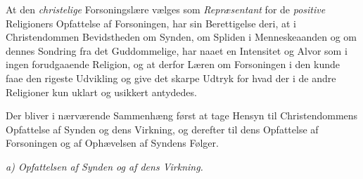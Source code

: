 At den \emph{christelige} Forsoningslære vælges som \emph{Repræsentant} for de
\emph{positive} Religioners Opfattelse af Forsoningen, har sin Berettigelse
deri, at i Christendommen Bevidstheden om Synden, om Spliden i Menneskeaanden og
om dennes Sondring fra det Guddommelige, har naaet en Intensitet og Alvor som i
ingen forudgaaende Religion, og at derfor Læren om Forsoningen i den kunde faae
den rigeste Udvikling og give det skarpe Udtryk for hvad der i de andre
Religioner kun uklart og usikkert antydedes.

 Der bliver i nærværende Sammenhæng først at tage Hensyn til Christendommens
Opfattelse af Synden og dens Virkning, og derefter til dens Opfattelse af
Forsoningen og af Ophævelsen af Syndens Følger.

\begin{center}
\emph{a) Opfattelsen af Synden og af dens Virkning.}
\end{center}

